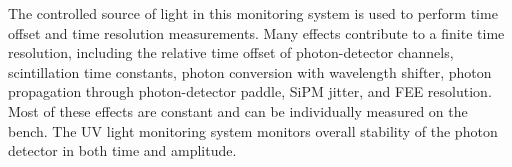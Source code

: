 

The controlled source of light  
in this monitoring system is used to perform time offset and time resolution measurements.  
Many effects contribute to a finite time resolution, including the relative time offset of photon-detector channels, scintillation time constants, 
photon conversion with wavelength shifter, photon propagation through photon-detector paddle, SiPM jitter, and FEE resolution. 
Most of these effects are constant and can be individually 
measured on the bench.  The UV light monitoring system monitors overall stability of the photon detector in both time
and amplitude.
